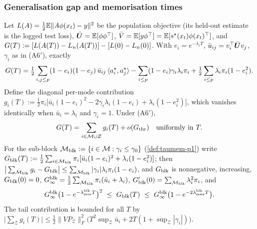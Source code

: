 \subsubsection{Generalisation gap and memorisation times}

\begin{proposition}\label{prop:gap-p1}
Let $L(A)=\tfrac12\mathbb{E}\|A\phi(x_t)-y\|^2$ be the population objective (its held-out estimate is the logged test loss), $\bar{\bm{U}}=\mathbb{E}[\phi\phi^{\top}]$, $\bar V=\mathbb{E}[y\phi^{\top}]=\mathbb{E}[s^\star(x_t)\phi(x_t)^{\top}]$, and $G(T):=[L(A(T))-L_{n}(A(T))]-[L(0)-L_{n}(0)]$. With $e_i=e^{-\lambda_iT}$, $\bar u_{ij}=v_i^{\top}\bar{\bm{U}} v_j$, $\gamma_i$ as in (A6$'$), exactly
\begin{equation}\label{eq:gap-exact-p1}
G(T)=\tfrac12\sum_{i,j\le p}(1-e_i)(1-e_j)\,\bar u_{ij}\,\langle a_i^\star,a_j^\star\rangle-\sum_{i\le p}(1-e_i)\gamma_i\lambda_i\pi_i+\tfrac12\sum_{i\le p}\lambda_i\pi_i(1-e_i^2).
\end{equation}
Define the diagonal per-mode contribution $g_i(T):=\tfrac12\pi_i\big[\bar u_i(1-e_i)^2-2\gamma_i\lambda_i(1-e_i)+\lambda_i(1-e_i^2)\big]$, which vanishes identically when $\bar u_i=\lambda_i$ and $\gamma_i=1$. Under (A6$'$),
\[
G(T)=\sum_{i\in\mathcal M\cup\mathcal Z}g_i(T)+o(G_{\rm thr})\quad\text{uniformly in }T .
\]
For the sub-block $\mathcal M_{\rm blk}:=\{i\in\mathcal M:\gamma_i\le\gamma_0\}$ (\cref{def:taumem-p1}) write $G_{\rm blk}(T):=\tfrac12\sum_{i\in\mathcal M_{\rm blk}}\pi_i[\bar u_i(1-e_i)^2+\lambda_i(1-e_i^2)]$; then $\big|\sum_{\mathcal M_{\rm blk}}g_i-G_{\rm blk}\big|\le\sum_{\mathcal M_{\rm blk}}|\gamma_i|\lambda_i\pi_i(1-e_i)$, and $G_{\rm blk}$ is nonnegative, increasing, $G_{\rm blk}(0)=0$, $G_\infty^{\rm blk}=\tfrac12\sum_{\mathcal M_{\rm blk}}\pi_i(\bar u_i+\lambda_i)$, $G_{\rm blk}'(0)=\sum_{\mathcal M_{\rm blk}}\lambda_i^2\pi_i$, and
\begin{equation}\label{eq:gap-bounds-p1}
G_\infty^{\rm blk}\big(1-e^{-\lambda^{\rm blk}_{\min}T}\big)^2\ \le\ G_{\rm blk}(T)\ \le\ G_\infty^{\rm blk}\big(1-e^{-2\lambda^{\rm blk}_{\max}T}\big).
\end{equation}
The tail contribution is bounded for all $T$ by $\big|\sum_{\mathcal Z}g_i(T)\big|\le\tfrac12\|VP_{\mathcal Z}\|_F^2\big(T^2\sup_{\mathcal Z}\bar u_i+2T(1+\sup_{\mathcal Z}|\gamma_i|)\big)$.
\end{proposition}
